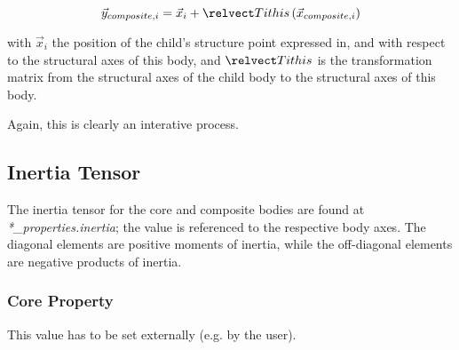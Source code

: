 \begin{equation}
 \vec{y}_{composite,i} = \vec{x}_i + \relvect T i {this} \left( 
 \vec{x}_{composite,i} \right)
\end{equation}

with $\vec{x}_i$ the position of the child's structure point expressed in, and 
with respect to the structural axes of this body, and $\relvect T i {this}$ is 
the transformation matrix from the structural axes of the child body to the 
structural axes of this body.

Again, this is clearly an interative process.


\subsection{Inertia Tensor}
The inertia tensor for the core and composite bodies are found at 
\textit{*\_properties.inertia}; the value is referenced to the respective body 
axes. The diagonal elements are positive moments of inertia, while the
off-diagonal elements are negative products of inertia.


\subsubsection {Core Property}
This value has to be set externally (e.g. by the user).
